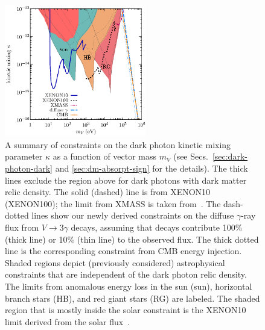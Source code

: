 \documentclass[prd,reprint,nofootinbib,notitlepage,aps,tightenlines,preprintnumbers,amsmath,amssymb,showpacs,superscriptaddress]{revtex4-1}
\begin{document}
%
\begin{figure}
\centering
\includegraphics[width=0.55\textwidth]{DM_contours.eps}%
\caption{\footnotesize A summary of constraints on the dark photon
  kinetic mixing parameter $\kappa$ as a function of vector mass $m_V$
  (see Secs.~\ref{sec:dark-photon-dark} and \ref{sec:dm-absorpt-sign}
  for the details). The thick lines exclude the region above for dark
  photons with dark matter relic density. The solid (dashed) line is
  from XENON10 (XENON100); the limit from XMASS is taken
  from~\cite{Abe:2014zcd}. The dash-dotted lines show our newly
  derived constraints on the diffuse $\gamma$-ray flux from
  $V\to 3\gamma$ decays, assuming that decays contribute 100\% (thick
  line) or 10\% (thin line) to the observed flux. The thick dotted
  line is the corresponding constraint from CMB energy
  injection. Shaded regions depict (previously considered)
  astrophysical constraints that are independent of the dark photon
  relic density. The limits from anomalous energy loss in the sun
  (sun), horizontal branch stars (HB), and red giant stars (RG) are
  labeled. The shaded region that is mostly inside the solar
  constraint is the XENON10 limit derived from the solar flux~\cite{An:2013yua}.}
\label{fig:summary}
\end{figure}
\end{document}
